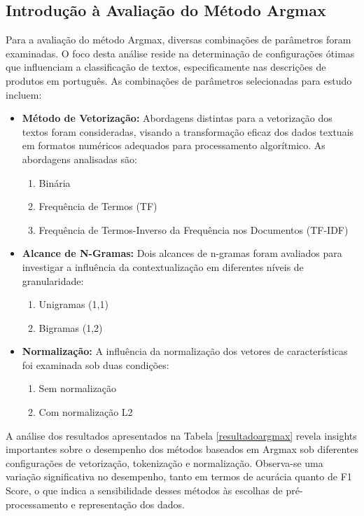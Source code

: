 \subsection{Introdução à Avaliação do Método Argmax}

Para a avaliação do método Argmax, diversas combinações de parâmetros foram examinadas. O foco desta análise reside na determinação de configurações ótimas que influenciam a classificação de textos, especificamente nas descrições de produtos em português. As combinações de parâmetros selecionadas para estudo incluem:

\begin{itemize}
\item \textbf{Método de Vetorização:} Abordagens distintas para a vetorização dos textos foram consideradas, visando a transformação eficaz dos dados textuais em formatos numéricos adequados para processamento algorítmico. As abordagens analisadas são:
\begin{enumerate}
\item Binária
\item Frequência de Termos (TF)
\item Frequência de Termos-Inverso da Frequência nos Documentos (TF-IDF)
\end{enumerate}
\item \textbf{Alcance de N-Gramas:} Dois alcances de n-gramas foram avaliados para investigar a influência da contextualização em diferentes níveis de granularidade:
\begin{enumerate}
\item Unigramas (1,1)
\item Bigramas (1,2)
\end{enumerate}
\item \textbf{Normalização:} A influência da normalização dos vetores de características foi examinada sob duas condições:
\begin{enumerate}
\item Sem normalização
\item Com normalização L2
\end{enumerate}
\end{itemize}
A análise dos resultados apresentados na Tabela \ref{resultadoargmax} revela insights importantes sobre o desempenho dos métodos baseados em Argmax sob diferentes configurações de vetorização, tokenização e normalização. Observa-se uma variação significativa no desempenho, tanto em termos de acurácia quanto de F1 Score, o que indica a sensibilidade desses métodos às escolhas de pré-processamento e representação dos dados.

